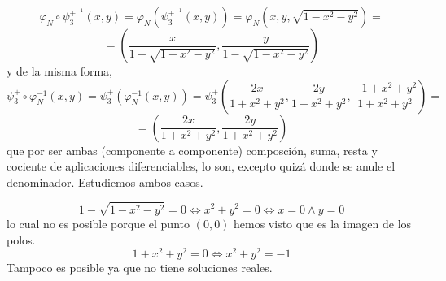 \begin{ejer}
\begin{enumerate}[a)]
\begin{sol}
\begin{enumerate}[1)]
                    $$\varphi_N \circ \psi_3^{+^{-1}} (x,y) = \varphi_N (\psi_3^{+^{-1}} (x,y)) = \varphi_N (x,y,\sqrt{1-x^2 - y^2}) = $$
                    $$=\left( \dfrac{x}{1-\sqrt{1-x^2 - y^2}}, \dfrac{y}{1-\sqrt{1-x^2 - y^2}} \right) $$
                    y de la misma forma, 
                    $$\psi_3^+ \circ \varphi_N^{-1}(x,y)=\psi_3^+(\varphi_N^{-1}(x,y))=\psi_3^+\left(\dfrac{2x}{1 + x^2 + y^2} , \dfrac{2y}{1 + x^2 + y^2}, \dfrac{-1 + x^2 + y^2}{1 + x^2 + y^2}\right) =$$ $$= \left(\dfrac{2x}{1 + x^2 + y^2} , \dfrac{2y}{1 + x^2 + y^2} \right)$$
                    que por ser ambas (componente a componente) composci\'on, suma, resta y cociente de aplicaciones diferenciables, lo son, excepto quiz\'a donde se anule el denominador. Estudiemos ambos casos.

                    $$1-\sqrt{1-x^2 - y^2} = 0 \iff x^2 + y^2 = 0 \iff x = 0 \wedge y = 0$$
                    lo cual no es posible porque el punto $(0,0)$ hemos visto que es la imagen de los polos.
                    $$1 + x^2 + y^2 = 0 \iff x^2 + y^2 = -1$$
                    Tampoco es posible ya que no tiene soluciones reales.
                \end{enumerate}
            \end{sol}
        \end{enumerate}
\end{ejer}
